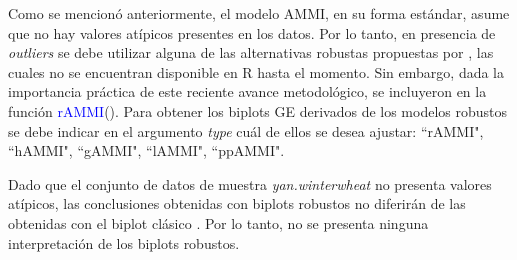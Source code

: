 

Como se mencionó anteriormente, el modelo AMMI, en su forma estándar, asume que no hay valores atípicos presentes en los datos. Por lo tanto, en presencia de \emph{outliers} se debe utilizar alguna de las alternativas robustas propuestas por \citet{Rodriguesetal2016}, las cuales no se encuentran disponible en R hasta el momento. Sin embargo, dada la importancia práctica de este reciente avance metodológico, se incluyeron en la función \textcolor{blue}{rAMMI}(). Para obtener los biplots GE derivados de los modelos robustos se debe indicar en el argumento \emph{type} cuál de ellos se desea ajustar: ``rAMMI", ``hAMMI", ``gAMMI", ``lAMMI", ``ppAMMI".

Dado que el conjunto de datos de muestra \emph{yan.winterwheat} no presenta valores atípicos, las conclusiones obtenidas con biplots robustos no diferirán de las obtenidas con el biplot clásico \citep{Rodriguesetal2016}. Por lo tanto, no se presenta ninguna interpretación de los biplots robustos. \\


